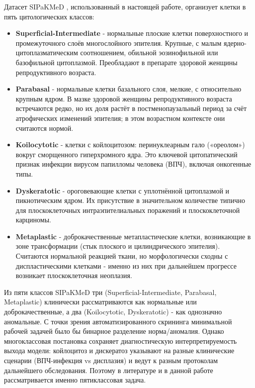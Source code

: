 \documentclass[14pt,a4paper]{extreport}
\begin{document}
Датасет SIPaKMeD \cite{plissiti2018sipakmed}, использованный в настоящей
работе, организует клетки в пять цитологических классов:
\begin{itemize}
    \item \textbf{Superficial-Intermediate} - нормальные плоские клетки
          поверхностного и промежуточного слоёв многослойного эпителия.
          Крупные, с малым ядерно-цитоплазматическим соотношением, обильной
          эозинофильной или базофильной цитоплазмой. Преобладают в препарате
          здоровой женщины репродуктивного возраста.
    \item \textbf{Parabasal} - нормальные клетки базального слоя, мелкие,
          с относительно крупным ядром. В мазке здоровой женщины
          репродуктивного возраста встречаются редко, но их доля растёт в
          постменопаузальный период за счёт атрофических изменений эпителия;
          в этом возрастном контексте они считаются нормой.
    \item \textbf{Koilocytotic} - клетки с койлоцитозом: перинуклеарным
          гало («ореолом») вокруг сморщенного гиперхромного ядра. Это
          ключевой цитопатический признак инфекции вирусом папилломы
          человека (ВПЧ), включая онкогенные типы.
    \item \textbf{Dyskeratotic} - ороговевающие клетки с уплотнённой
          цитоплазмой и пикнотическим ядром. Их присутствие в значительном
          количестве типично для плоскоклеточных интраэпителиальных
          поражений и плоскоклеточной карциномы.
    \item \textbf{Metaplastic} - доброкачественные метапластические клетки,
          возникающие в зоне трансформации (стык плоского и
          цилиндрического эпителия). Считаются нормальной реакцией ткани,
          но морфологически сходны с диспластическими клетками - именно
          из них при дальнейшем прогрессе возникает плоскоклеточная
          неоплазия.
\end{itemize}

Из пяти классов SIPaKMeD три (Superficial-Intermediate, Parabasal,
Metaplastic) клинически рассматриваются как нормальные или
доброкачественные, а два (Koilocytotic, Dyskeratotic) - как однозначно
аномальные. С точки зрения автоматизированного скрининга минимальной
рабочей задачей было бы бинарное разделение норма/аномалия. Однако
многоклассовая постановка сохраняет диагностическую интерпретируемость
выхода модели: койлоцитоз и дискератоз указывают на разные клинические
сценарии (ВПЧ-инфекция vs дисплазия) и ведут к разным протоколам
дальнейшего обследования. Поэтому в литературе и в данной работе
рассматривается именно пятиклассовая задача.
\end{document}
